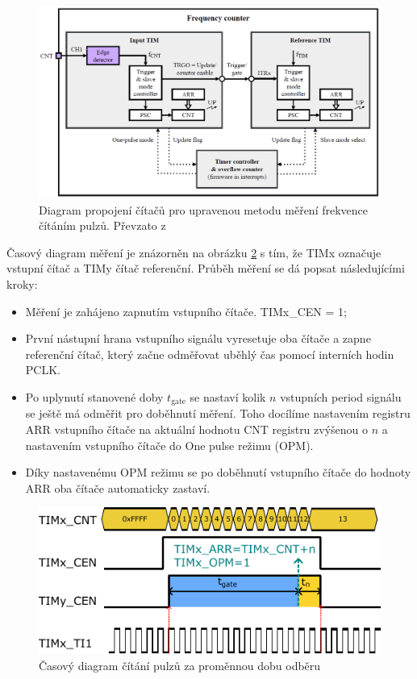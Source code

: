  \begin{figure}[H]
 	\centering
 	\includegraphics[width=0.7\linewidth]{Figs/Documentation/DujavaFrequencyCounter}
 	\caption{Diagram propojení čítačů pro upravenou metodu měření frekvence čítáním pulzů. Převzato z \cite{DujavaDIP}}
 	\label{fig:dujavafrequencycounter}
 \end{figure}
 
 Časový diagram měření je znázorněn na obrázku \ref{fig:PulseCounter} s tím, že TIMx označuje vstupní čítač a TIMy čítač referenční. Průběh měření se dá popsat následujícími kroky:
 \begin{itemize}
 	\item Měření je zahájeno zapnutím vstupního čítače. TIMx\_CEN = 1;
 	\item První nástupní hrana vstupního signálu vyresetuje oba čítače a zapne referenční čítač, který začne odměřovat uběhlý čas pomocí interních hodin PCLK.
 	\item Po uplynutí stanovené doby $t_{\text{gate}}$ se nastaví kolik $n$ vstupních period signálu se ještě má odměřit pro doběhnutí měření. Toho docílíme nastavením registru ARR vstupního čítače na aktuální hodnotu CNT registru zvýšenou o $n$ a nastavením vstupního čítače do One pulse režimu (OPM).
 	\item Díky nastavenému OPM režimu se po doběhnutí vstupního čítače do hodnoty ARR oba čítače automaticky zastaví.
 \end{itemize}
 
 
 
 \begin{figure}[H]
 	\centering
 	\includegraphics[width=0.7\linewidth]{Figs/Diagrams/SVG/PulseCounter.pdf}
 	\caption{Časový diagram čítání pulzů za proměnnou dobu odběru}
 	\label{fig:PulseCounter}
 \end{figure}
 
